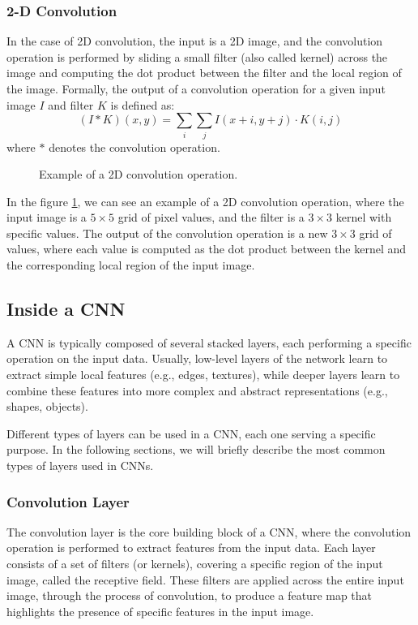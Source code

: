 \subsubsection*{2-D Convolution}
In the case of 2D convolution, the input is a 2D image, and the convolution operation is performed by sliding a small filter (also called kernel) across the image and computing the dot product between the filter and the local region of the image.
Formally, the output of a convolution operation for a given input image $I$ and filter $K$ is defined as:
$$ (I * K)(x, y) = \sum_{i} \sum_{j} I(x+i, y+j) \cdot K(i, j) $$
where $ * $ denotes the convolution operation.

\begin{figure}[H]
    \centering
    
    \caption{Example of a 2D convolution operation.}
    \label{fig:2D-convolution}
\end{figure}
In the figure \ref{fig:2D-convolution}, we can see an example of a 2D convolution operation, where the input image is a $5 \times 5$ grid of pixel values, and the filter is a $3 \times 3$ kernel with specific values. 
The output of the convolution operation is a new $3 \times 3$ grid of values, where each value is computed as the dot product between the kernel and the corresponding local region of the input image.

\subsection{Inside a CNN}
A CNN is typically composed of several stacked layers, each performing a specific operation on the input data. 
Usually, low-level layers of the network learn to extract simple local features (e.g., edges, textures), while deeper layers learn to combine these features 
into more complex and abstract representations (e.g., shapes, objects).

Different types of layers can be used in a CNN, each one serving a specific purpose. In the following sections, we will briefly describe the most common types of layers used in CNNs.

\subsubsection{Convolution Layer}
The convolution layer is the core building block of a CNN, where the convolution operation is performed to extract features from the input data.
Each layer consists of a set of filters (or kernels), covering a specific region of the input image, called the receptive field. 
These filters are applied across the entire input image, through the process of convolution, to produce a feature map that highlights the presence 
of specific features in the input image.

